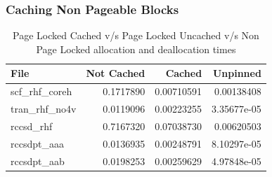 \documentclass{beamer}
\begin{document}
\begin{frame}[fragile]
  \frametitle{Caching Non Pageable Blocks}
  \pause
  \begin{table}[h]
    \centering
    \begin{tabular}{l<{\onslide<2->} | r<{\onslide<3->} | r<{\onslide<4->} | r<{\onslide}}
      \hline
      File            & Not Cached & Cached     & Unpinned    \\
      \hline
      scf\_rhf\_coreh & 0.1717890  & 0.00710591 & 0.00138408  \\
      tran\_rhf\_no4v & 0.0119096  & 0.00223255 & 3.35677e-05 \\
      rccsd\_rhf      & 0.7167320  & 0.07038730 & 0.00620503  \\
      rccsdpt\_aaa    & 0.0136935  & 0.00248791 & 8.10297e-05 \\
      rccsdpt\_aab    & 0.0198253  & 0.00259629 & 4.97848e-05 \\
      \hline
    \end{tabular}
    \caption{Page Locked Cached v/s Page Locked Uncached v/s Non Page Locked allocation
      and deallocation times}
  \end{table}
\end{frame}
\end{document}
